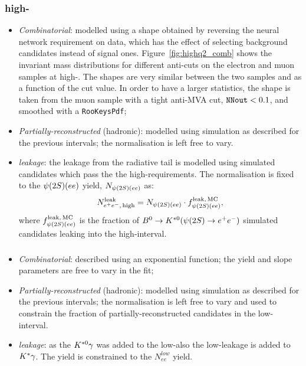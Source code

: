 \subsubsection*{\BdToKstee high-\qsq}
%
\begin{itemize}

\item \textit{Combinatorial}: modelled using a shape obtained by reversing the neural network requirement on data,
which has the effect of selecting background candidates instead of signal ones.
Figure~\ref{fig:highq2_comb} shows the invariant mass distributions for different anti-cuts on the electron 
and muon samples at high-\qsq. The shapes are very similar between the two samples and as a function 
of the cut value. In order to have a larger statistics, the shape is taken from the muon sample with a tight
anti-MVA cut, $\verb!NNout! < 0.1$, and smoothed with a \texttt{RooKeysPdf};

\item \textit{Partially-reconstructed} (hadronic): modelled using simulation as described for the previous intervals;
 the normalisation is left free to vary.

\item \textit{\BdToKstPsi leakage}: the leakage from the \psitwos radiative tail is modelled using simulated 
\BdToKstPsiee candidates which pass the the high-\qsq requirements. The normalisation is fixed to 
the $\psitwos(ee)$ yield, $N_{\psitwos(ee)}$ as:
%
$$N_{\ee, \, {\rm high}}^{\rm leak} = N_{\psitwos(ee)} \cdot f_{\psitwos(ee)}^{\rm leak, \,MC},$$
%
where $f_{\psitwos(ee)}^{\rm leak, \,MC}$ is the fraction of $\Bd\to\Kstarz(\psitwos\to\ee)$ simulated candidates
leaking into the high-\qsq interval.

\end{itemize}

\subsubsection*{\BdToKstG}

\begin{itemize}

\item \textit{Combinatorial}: described using an exponential function; the yield and slope parameters are free to vary in the fit;

\item \textit{Partially-reconstructed} (hadronic): modelled using simulation as described for the previous intervals;
 the normalisation is left free to vary and used to constrain the fraction of partially-reconstructed candidates in the low-\qsq interval.

\item \textit{\BdToKstee leakage}: as the ${{K}^{*0}}\gamma$ was added to the low-\qsq also the low-\qsq leakage is added
to ${{K}^*}\gamma$. The yield is constrained to the $N_{ee}^{low}$ yield.

\end{itemize}

